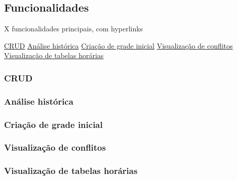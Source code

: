 \subsection{Funcionalidades} \label{ssec:funcionalidades}

X funcionalidades principais, com hyperlinks

\hyperref[sssec:CRUD]{CRUD}
\hyperref[sssec:Análise histórica]{Análise histórica}
\hyperref[sssec:Criação de grade inicial]{Criação de grade inicial}
\hyperref[sssec:Visualização de conflitos]{Visualização de conflitos}
\hyperref[sssec:Visualização de tabelas horárias]{Visualização de tabelas horárias}


\subsubsection{CRUD} \label{sssec:CRUD}

\subsubsection{Análise histórica} \label{sssec:Análise histórica}

\subsubsection{Criação de grade inicial} \label{sssec:Criação de grade inicial}

\subsubsection{Visualização de conflitos} \label{sssec:Visualização de conflitos}

\subsubsection{Visualização de tabelas horárias} \label{sssec:Visualização de tabelas horárias}
